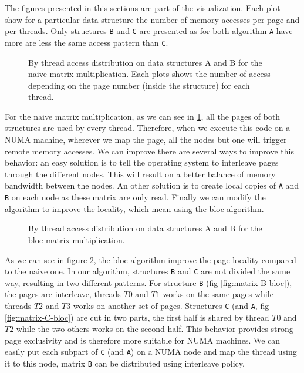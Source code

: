 The figures presented in this sections are part of the \TABARNAC visualization.
Each plot show for a particular data structure the number of memory accesses
per page and per threads. Only structures \texttt{B} and \texttt{C} are
presented as for both algorithm \texttt{A} have more are less the same access
pattern than \texttt{C}.

\begin{figure}[htb]
    \centering
    \caption{By thread access distribution on data structures A and B for the
        naive matrix multiplication. Each plots shows the number of access
    depending on the page number (inside the structure) for each thread.}
    \label{fig:matrix-naive}
\end{figure}

For the naive matrix multiplication, as we can see in
\ref{fig:matrix-naive}, all the pages of both structures are used by every
thread. Therefore, when we execute this code on a NUMA machine, wherever we
map the page, all the nodes but one will trigger remote memory accesses. We
can improve there are several ways to improve this behavior: an easy solution
is to tell the operating system to interleave pages through the different
nodes. This will result on a better balance of memory bandwidth between the
nodes. An other solution is to create local copies of \texttt{A} and
\texttt{B} on each node as these matrix are only read. Finally we can modify
the algorithm to improve the locality, which mean using the bloc algorithm.

\begin{figure}[htb]
    \centering
    \caption{By thread access distribution on data structures A and B for the
    bloc matrix multiplication.}
    \label{fig:matrix-bloc}
\end{figure}

As we can see in figure \ref{fig:matrix-bloc}, the bloc algorithm improve the page
locality compared to the naive one. In our algorithm, structures \texttt{B}
and \texttt{C} are not divided the same way, resulting in two different
patterns. For structure \texttt{B} (fig \ref{fig:matrix-B-bloc}), the pages
are interleave, threads $T0$ and $T1$ works on the same pages while threads
$T2$ and $T3$ works on another set of pages. Structures \texttt{C} (and
\texttt{A}, fig \ref{fig:matrix-C-bloc}) are cut in two parts, the first half
is shared by thread $T0$ and $T2$ while the two others works on the second
half. This behavior provides strong page exclusivity and is therefore more
suitable for NUMA machines. We can easily put each subpart of \texttt{C} (and
\texttt{A}) on a NUMA node and map the thread using it to this node, matrix
\texttt{B} can be distributed using interleave policy.

